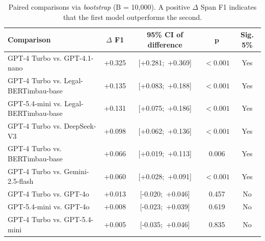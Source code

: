 \begin{table}[ht]
    \centering
    \caption{Paired comparisons via \textit{bootstrap} (B = 10,000). A positive $\Delta$ Span F1 indicates that the first model outperforms the second.}
    \label{tab:bootstrap_paired}
    \small
    \begin{tabular}{lcccc}
        \hline
        \textbf{Comparison} & $\Delta$ \textbf{F1} & \textbf{95\% CI of difference} & $\mathbf{p}$ & \textbf{Sig. 5\%} \\
        \hline
        GPT-4 Turbo vs. GPT-4.1-nano & +0.325 & [+0.281;\ +0.369] & $< 0.001$ & Yes \\
        GPT-4 Turbo vs. Legal-BERTimbau-base & +0.135 & [+0.083;\ +0.188] & $< 0.001$ & Yes \\
        GPT-5.4-mini vs. Legal-BERTimbau-base & +0.131 & [+0.075;\ +0.186] & $< 0.001$ & Yes \\
        GPT-4 Turbo vs. DeepSeek-V3 & +0.098 & [+0.062;\ +0.136] & $< 0.001$ & Yes \\
        GPT-4 Turbo vs. BERTimbau-base & +0.066 & [+0.019;\ +0.113] & 0.006 & Yes \\
        GPT-4 Turbo vs. Gemini-2.5-flash & +0.060 & [+0.028;\ +0.091] & $< 0.001$ & Yes \\
        GPT-4 Turbo vs. GPT-4o & +0.013 & [-0.020;\ +0.046] & 0.457 & No \\
        GPT-5.4-mini vs. GPT-4o & +0.008 & [-0.023;\ +0.039] & 0.619 & No \\
        GPT-4 Turbo vs. GPT-5.4-mini & +0.005 & [-0.035;\ +0.046] & 0.835 & No \\
        \hline
    \end{tabular}
\end{table}
